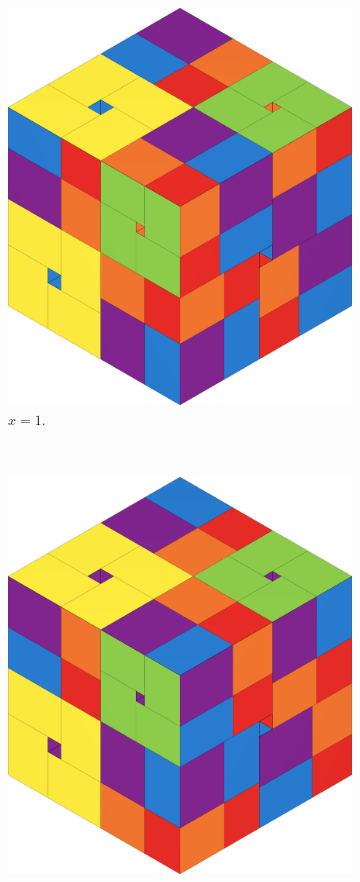 \begin{figure}[ht]
    \centering
    \begin{subfigure}[b]{0.47\textwidth}
        \centering
        \includegraphics[scale=0.18]{graphics/4d-universal-cube-1.png}
        \caption*{$x = 1$.}
    \end{subfigure}
    ~
    \begin{subfigure}[b]{0.47\textwidth}
        \centering
        \includegraphics[scale=0.18]{graphics/4d-universal-cube-2.png}

\end{subfigure}
\end{figure}
